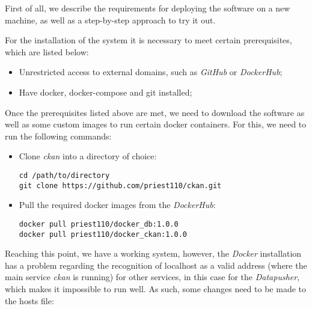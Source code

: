 First of all, we describe the requirements for deploying the software on a new machine, as well as a step-by-step approach to try it out.

\newpage

For the installation of the system it is necessary to meet certain prerequisites, which are listed below:

\begin{itemize}
    \item Unrestricted access to external domains, such as \textit{GitHub} or \textit{DockerHub};
    \item Have docker, docker-compose and git installed;
\end{itemize}

Once the prerequisites listed above are met, we need to download the software as well as some custom images to run certain docker containers. For this, we need to run the following commands:

\begin{itemize}
    \item Clone \textit{\gls{ckan}} into a directory of choice:
        \begin{verbatim}
cd /path/to/directory
git clone https://github.com/priest110/ckan.git
        \end{verbatim}
    \item Pull the required docker images from the \textit{DockerHub}:
        \begin{verbatim}
docker pull priest110/docker_db:1.0.0
docker pull priest110/docker_ckan:1.0.0
        \end{verbatim}    
\end{itemize}

Reaching this point, we have a working system, however, the \textit{Docker} installation has a problem regarding the recognition of localhost as a valid address (where the main service \textit{\gls{ckan}} is running) for other services, in this case for the \textit{Datapusher}, which makes it impossible to run well. As such, some changes need to be made to the hosts file:

